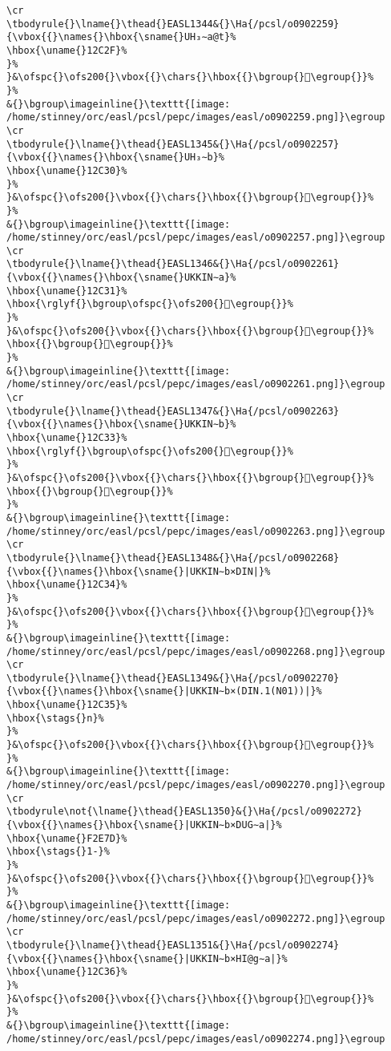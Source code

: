 \begin{verbatim}
\cr
\tbodyrule{}\lname{}\thead{}EASL1344&{}\Ha{/pcsl/o0902259}{\vbox{{}\names{}\hbox{\sname{}UH₃∼a@t}%
\hbox{\uname{}12C2F}%
}%
}&\ofspc{}\ofs200{}\vbox{{}\chars{}\hbox{{}\bgroup{}𒰯\egroup{}}%
}%
&{}\bgroup\imageinline{}\texttt{[image: /home/stinney/orc/easl/pcsl/pepc/images/easl/o0902259.png]}\egroup
\cr
\tbodyrule{}\lname{}\thead{}EASL1345&{}\Ha{/pcsl/o0902257}{\vbox{{}\names{}\hbox{\sname{}UH₃∼b}%
\hbox{\uname{}12C30}%
}%
}&\ofspc{}\ofs200{}\vbox{{}\chars{}\hbox{{}\bgroup{}𒰰\egroup{}}%
}%
&{}\bgroup\imageinline{}\texttt{[image: /home/stinney/orc/easl/pcsl/pepc/images/easl/o0902257.png]}\egroup
\cr
\tbodyrule{}\lname{}\thead{}EASL1346&{}\Ha{/pcsl/o0902261}{\vbox{{}\names{}\hbox{\sname{}UKKIN∼a}%
\hbox{\uname{}12C31}%
\hbox{\rglyf{}\bgroup\ofspc{}\ofs200{}𒰱\egroup{}}%
}%
}&\ofspc{}\ofs200{}\vbox{{}\chars{}\hbox{{}\bgroup{}𒰲\egroup{}}%
\hbox{{}\bgroup{}𒰱\egroup{}}%
}%
&{}\bgroup\imageinline{}\texttt{[image: /home/stinney/orc/easl/pcsl/pepc/images/easl/o0902261.png]}\egroup
\cr
\tbodyrule{}\lname{}\thead{}EASL1347&{}\Ha{/pcsl/o0902263}{\vbox{{}\names{}\hbox{\sname{}UKKIN∼b}%
\hbox{\uname{}12C33}%
\hbox{\rglyf{}\bgroup\ofspc{}\ofs200{}𒰳\egroup{}}%
}%
}&\ofspc{}\ofs200{}\vbox{{}\chars{}\hbox{{}\bgroup{}𒰼\egroup{}}%
\hbox{{}\bgroup{}𒰳\egroup{}}%
}%
&{}\bgroup\imageinline{}\texttt{[image: /home/stinney/orc/easl/pcsl/pepc/images/easl/o0902263.png]}\egroup
\cr
\tbodyrule{}\lname{}\thead{}EASL1348&{}\Ha{/pcsl/o0902268}{\vbox{{}\names{}\hbox{\sname{}|UKKIN∼b×DIN|}%
\hbox{\uname{}12C34}%
}%
}&\ofspc{}\ofs200{}\vbox{{}\chars{}\hbox{{}\bgroup{}𒰴\egroup{}}%
}%
&{}\bgroup\imageinline{}\texttt{[image: /home/stinney/orc/easl/pcsl/pepc/images/easl/o0902268.png]}\egroup
\cr
\tbodyrule{}\lname{}\thead{}EASL1349&{}\Ha{/pcsl/o0902270}{\vbox{{}\names{}\hbox{\sname{}|UKKIN∼b×(DIN.1(N01))|}%
\hbox{\uname{}12C35}%
\hbox{\stags{}n}%
}%
}&\ofspc{}\ofs200{}\vbox{{}\chars{}\hbox{{}\bgroup{}𒰵\egroup{}}%
}%
&{}\bgroup\imageinline{}\texttt{[image: /home/stinney/orc/easl/pcsl/pepc/images/easl/o0902270.png]}\egroup
\cr
\tbodyrule\not{\lname{}\thead{}EASL1350}&{}\Ha{/pcsl/o0902272}{\vbox{{}\names{}\hbox{\sname{}|UKKIN∼b×DUG∼a|}%
\hbox{\uname{}F2E7D}%
\hbox{\stags{}1-}%
}%
}&\ofspc{}\ofs200{}\vbox{{}\chars{}\hbox{{}\bgroup{}󲹽\egroup{}}%
}%
&{}\bgroup\imageinline{}\texttt{[image: /home/stinney/orc/easl/pcsl/pepc/images/easl/o0902272.png]}\egroup
\cr
\tbodyrule{}\lname{}\thead{}EASL1351&{}\Ha{/pcsl/o0902274}{\vbox{{}\names{}\hbox{\sname{}|UKKIN∼b×HI@g∼a|}%
\hbox{\uname{}12C36}%
}%
}&\ofspc{}\ofs200{}\vbox{{}\chars{}\hbox{{}\bgroup{}𒰶\egroup{}}%
}%
&{}\bgroup\imageinline{}\texttt{[image: /home/stinney/orc/easl/pcsl/pepc/images/easl/o0902274.png]}\egroup

\end{verbatim}
